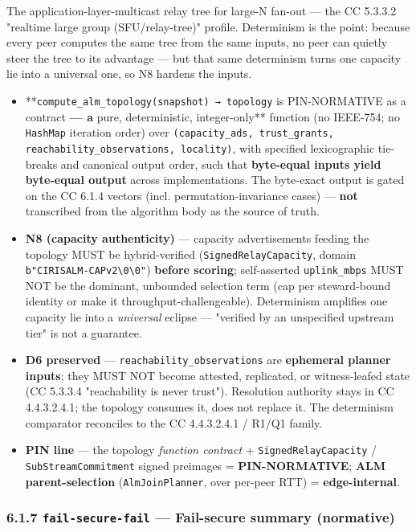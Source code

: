 \documentclass[11pt]{article}
\begin{document}
The application-layer-multicast relay tree for large-N fan-out — the CC 5.3.3.2 "realtime large group (SFU/relay-tree)" profile. Determinism is the point: because every peer computes the same tree from the same inputs, no peer can quietly steer the tree to its advantage — but that same determinism turns one capacity lie into a universal one, so N8 hardens the inputs.


\begin{itemize}\setlength\itemsep{0pt}
\item **\texttt{compute\_alm\_topology(snapshot) → topology} is PIN-NORMATIVE as a contract\textbf{ — a }pure, deterministic, integer-only** function (no IEEE-754; no \texttt{HashMap} iteration order) over \texttt{(capacity\_ads, trust\_grants, reachability\_observations, locality)}, with specified lexicographic tie-breaks and canonical output order, such that \textbf{byte-equal inputs yield byte-equal output} across implementations. The byte-exact output is gated on the CC 6.1.4 vectors (incl. permutation-invariance cases) — \textbf{not} transcribed from the algorithm body as the source of truth.
\item \textbf{N8 (capacity authenticity)} — capacity advertisements feeding the topology MUST be hybrid-verified (\texttt{SignedRelayCapacity}, domain \texttt{b"CIRISALM-CAPv2\textbackslash{}0\textbackslash{}0"}) \textbf{before scoring}; self-asserted \texttt{uplink\_mbps} MUST NOT be the dominant, unbounded selection term (cap per steward-bound identity or make it throughput-challengeable). Determinism amplifies one capacity lie into a \textit{universal} eclipse — "verified by an unspecified upstream tier" is not a guarantee.
\item \textbf{D6 preserved} — \texttt{reachability\_observations} are \textbf{ephemeral planner inputs}; they MUST NOT become attested, replicated, or witness-leafed state (CC 5.3.3.4 "reachability is never trust"). Resolution authority stays in CC 4.4.3.2.4.1; the topology consumes it, does not replace it. The determinism comparator reconciles to the CC 4.4.3.2.4.1 / R1/Q1 family.
\item \textbf{PIN line} — the topology \textit{function contract} + \texttt{SignedRelayCapacity} / \texttt{SubStreamCommitment} signed preimages = \textbf{PIN-NORMATIVE}; \textbf{ALM parent-selection} (\texttt{AlmJoinPlanner}, over per-peer RTT) = \textbf{edge-internal}.
\end{itemize}


\subsubsection*{6.1.7 \texttt{fail-secure-fail} — Fail-secure summary (normative)}
\end{document}
